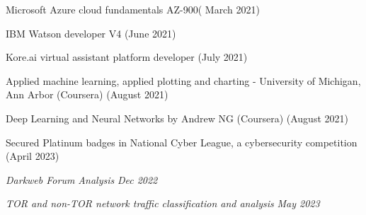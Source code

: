 \documentclass[10pt]{article}
\begin{document}
{\vspace{-0.4ex}
    \begin{circlist}
        \item Microsoft Azure cloud fundamentals AZ-900( March 2021)
        \item IBM Watson developer V4 (June 2021)
        \item Kore.ai virtual assistant platform developer (July 2021)
        \item Applied machine learning, applied plotting and charting - University of Michigan, Ann Arbor (Coursera) (August 2021)
        \item Deep Learning and Neural Networks by Andrew NG (Coursera) (August 2021)
        \item Secured Platinum badges in National Cyber League, a cybersecurity competition (April 2023)
    \end{circlist}
}



\spacedhrule{0.8ex}{0.0ex}




\raggedright {  \textit{Darkweb Forum Analysis}}
{\hfill{\em \textit{Dec 2022}}}
{\vspace{0ex}
\begin{circlist}	
	    
            \item \normalfont {}
\end{circlist}
}

\raggedright {  \textit{TOR and non-TOR network traffic classification and analysis}}
{\hfill {\em \textit{May 2023}}}
{\vspace{0ex}
\begin{circlist}	
	
            \item \normalfont {}
\end{circlist}
}

\vspace{0.2ex}



\spacedhrule{0.8ex}{0.0ex}




{\vspace{-0.2ex}
    \begin{circlist}
        \item {}
        \item {}
         \item {}
    \end{circlist}
}
\spacedhrule{0.8ex}{0.0ex}
\end{document}
